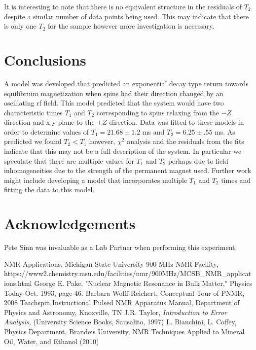 \documentclass[11pt,letterpaper]{article}
\begin{document}
It is interesting to note that there is no equivalent structure in the residuals of $T_2$ despite a similar number of data points being used. This may indicate that there is only one $T_2$ for the sample however more investigation is necessary.
\section{Conclusions}
A model was developed that predicted an exponential decay type return towards equilibrium magnetization when spins had their direction changed by an oscillating rf field. This model predicted that the system would have two characteristic times $T_1$ and $T_2$ corresponding to spins relaxing from the $-Z$ direction and x-y plane to the $+Z$ direction. Data was fitted to these models in order to determine values of $T_1=21.68\pm 1.2$ ms and $T_2=6.25\pm .55$ ms. As predicted we found $T_2<T_1$ however, $\chi^2$ analysis and the residuals from the fits indicate that this may not be a full description of the system. In particular we speculate that there are multiple values for $T_1$ and $T_2$ perhaps due to field inhomogeneities due to the strength of the permanent magnet used. Further work might include developing a model that incorporates multiple $T_1$ and $T_2$ times and fitting the data to this model.
\section{Acknowledgements}
Pete Sinn was invaluable as a Lab Partner when performing this experiment.

\begin{thebibliography}{99}
 NMR Applications, Michigan State University 900 MHz NMR Facility, https://www2.chemistry.msu.edu/facilities/nmr/900MHz/MCSB\_NMR\_applications.html
 George E. Pake, "Nuclear Magnetic Resonance in Bulk Matter," Physics Today Oct. 1993, page 46.  
 Barbara Wolff-Reichert, Conceptual Tour of PNMR, 2008 
 Teachspin Instructional Pulsed NMR Apparatus Manual, Department of Physics and Astronomy, Knoxville, TN
 J.R. Taylor, {\it Introduction to Error Analysis}, (University Science Books, Sausalito, 1997)
 L. Bianchini, L. Coffey, Physics Department, Brandeis University, NMR Techniques Applied to Mineral Oil, Water, and Ethanol (2010)


\end{thebibliography}
\end{document}
